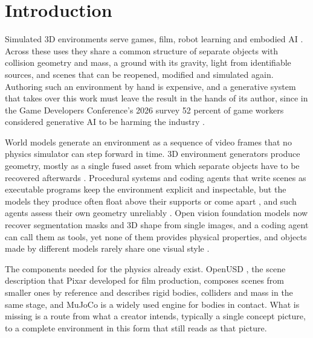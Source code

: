 \section{Introduction}\label{introduction}

Simulated 3D environments serve games, film, robot learning and embodied AI \citep{yang2024holodeck}. Across these uses they share a common structure of separate objects with collision geometry and mass, a ground with its gravity, light from identifiable sources, and scenes that can be reopened, modified and simulated again. Authoring such an environment by hand is expensive, and a generative system that takes over this work must leave the result in the hands of its author, since in the Game Developers Conference's 2026 survey 52 percent of game workers considered generative AI to be harming the industry \citep{gdc2026survey}.

World models generate an environment as a sequence of video frames \citep{bruce2024genie, genie3} that no physics simulator can step forward in time. 3D environment generators \citep{wang2025worldgen, hyworld2} produce geometry, mostly as a single fused asset from which separate objects have to be recovered afterwards \citep{hu2026worldact, niu2026worldsculpt}. Procedural systems \citep{raistrick2023infinigen, raistrick2024indoors} and coding agents that write scenes as executable programs \citep{hu2024scenecraft, li2026rcwm, guo2026worldclaw, yin2026autoue, he2026thinking, wang2026codeasworlds} keep the environment explicit and inspectable, but the models they produce often float above their supports or come apart \citep{gao2026codebench3d}, and such agents assess their own geometry unreliably \citep{li2026lego}. Open vision foundation models now recover segmentation masks \citep{carion2025sam3} and 3D shape \citep{li2026pixal3d, xiang2024trellis, trellis2} from single images, and a coding agent can call them as tools, yet none of them provides physical properties, and objects made by different models rarely share one visual style \citep{wu2026production, yang2026flowscene}.

The components needed for the physics already exist. OpenUSD \citep{openusd}, the scene description that Pixar developed for film production, composes scenes from smaller ones by reference and describes rigid bodies, colliders and mass in the same stage, and MuJoCo \citep{todorov2012mujoco} is a widely used engine for bodies in contact. What is missing is a route from what a creator intends, typically a single concept picture, to a complete environment in this form that still reads as that picture.

